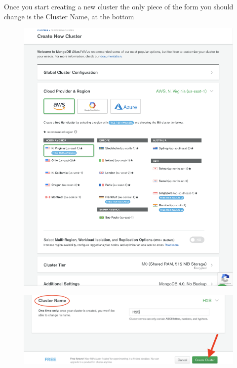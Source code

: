 \documentclass{42-en}
\begin{document}
\newpage
Once you start creating a new cluster the only piece of the form you should change is the Cluster Name, at the bottom
\begin{figure}[H]
    \begin{center}
        \includegraphics[width=12cm]{WEB/mongo_2.png}
    \end{center}
\end{figure}

\begin{figure}[H]
    \begin{center}
        \includegraphics[width=14cm]{WEB/mongo_3.png}
    \end{center}
\end{figure}
\end{document}
